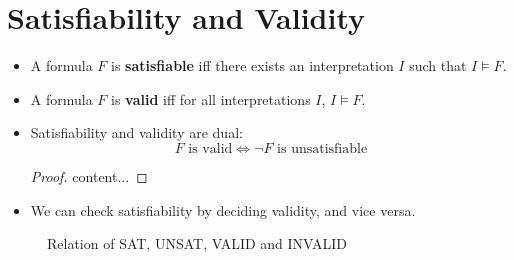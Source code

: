 \section{Satisfiability and Validity}
\begin{itemize}
	\item A formula $F$ is \textbf{satisfiable} iff there exists an interpretation $I$ such that $I\models F$.
	\item A formula $F$ is \textbf{valid} iff for all interpretations $I$, $I\models F$.
	\item Satisfiability and validity are dual: \[
	\text{$F$ is valid}\iff\text{$\lnot F$ is unsatisfiable}
	\]
	\begin{proof}
		content...
	\end{proof}
	\item We can check satisfiability by deciding validity, and vice versa.
\end{itemize}

\begin{figure}[h!]\centering
{}
\caption{Relation of SAT, UNSAT, VALID and INVALID}
\end{figure}

\begin{figure}[h!]\centering

\end{figure}

\newpage

